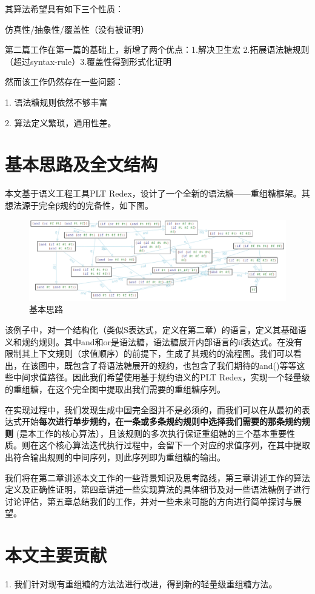 其算法希望具有如下三个性质：

仿真性/抽象性/覆盖性（没有被证明）

第二篇工作在第一篇的基础上，新增了两个优点：1.解决卫生宏 2.拓展语法糖规则（超过syntax-rule）3.覆盖性得到形式化证明

然而该工作仍然存在一些问题：

1.	语法糖规则依然不够丰富

2.	算法定义繁琐，通用性差。
\section{基本思路及全文结构}

本文基于语义工程工具PLT Redex，设计了一个全新的语法糖——重组糖框架。其想法源于完全β规约的完备性，如下图。

\begin{figure}[h]
	\centering
	\includegraphics[width=12cm]{images/chapter1/example.png}
	\caption{基本思路}
\end{figure}

该例子中，对一个结构化（类似S表达式，定义在第二章）的语言，定义其基础语义和规约规则。其中and和or是语法糖，语法糖展开内部语言的if表达式。在没有限制其上下文规则（求值顺序）的前提下，生成了其规约的流程图。我们可以看出，在该图中，既包含了将语法糖展开的规约，也包含了我们期待的and()等等这些中间求值路径。因此我们希望使用基于规约语义的PLT Redex，实现一个轻量级的重组糖，在这个完全图中提取出我们需要的重组糖序列。

在实现过程中，我们发现生成中国完全图并不是必须的，而我们可以在从最初的表达式开始{\bfseries 每次进行单步规约，在一条或多条规约规则中选择我们需要的那条规约规则 }(是本工作的核心算法），且该规则的多次执行保证重组糖的三个基本重要性质。则在这个核心算法迭代执行过程中，会留下一个对应的求值序列，在其中提取出符合输出规则的中间序列，则此序列即为重组糖的输出。

我们将在第二章讲述本文工作的一些背景知识及思考路线，第三章讲述工作的算法定义及正确性证明，第四章讲述一些实现算法的具体细节及对一些语法糖例子进行讨论评估，第五章总结我们的工作，并对一些未来可能的方向进行简单探讨与展望。

\section{本文主要贡献}
\begin{flushleft}
	1.	我们针对现有重组糖的方法法进行改进，得到新的轻量级重组糖方法。
\end{flushleft}

